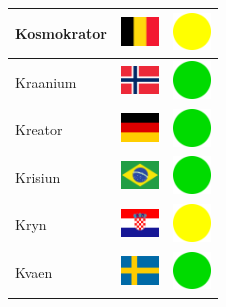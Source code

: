 \documentclass[12pt, a4paper, twoside]{report}
\begin{document}
\begin{center}
\begin{longtable}{|p{5cm}|p{2cm}|p{2cm}|}
 Kosmokrator                                                & \includegraphics[width=1cm]{../4x3/be} &   \includegraphics[width=1cm]{../likes/m} \\ \hline
 Kraanium                                                   & \includegraphics[width=1cm]{../4x3/no} &   \includegraphics[width=1cm]{../likes/y} \\ \hline
 Kreator                                                    & \includegraphics[width=1cm]{../4x3/de} &   \includegraphics[width=1cm]{../likes/y} \\ \hline
 Krisiun                                                    & \includegraphics[width=1cm]{../4x3/br} &   \includegraphics[width=1cm]{../likes/y} \\ \hline
 Kryn                                                       & \includegraphics[width=1cm]{../4x3/hr} &   \includegraphics[width=1cm]{../likes/m} \\ \hline
 Kvaen                                                      & \includegraphics[width=1cm]{../4x3/se} &   \includegraphics[width=1cm]{../likes/y} \\ \hline

\end{longtable}
\end{center}
\end{document}
